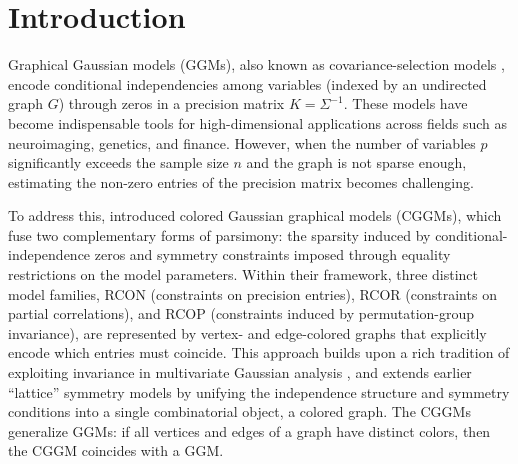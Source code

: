 \documentclass[12pt]{amsart}
\theoremstyle{plain}
\theoremstyle{definition}
\theoremstyle{remark}
\newcommand{\1}{\mathbf{1}}
\begin{document}
\section{Introduction}

Graphical Gaussian models (GGMs), also known as covariance-selection models \citep{D72,L96}, encode conditional independencies among variables (indexed by an undirected graph $G$) through zeros in a precision matrix $K=\Sigma^{-1}$. These models have become indispensable tools for high-dimensional applications across fields such as neuroimaging, genetics, and finance. However, when the number of variables $p$ significantly exceeds the sample size $n$ and the graph is not sparse enough, estimating the non-zero entries of the precision matrix becomes challenging.

To address this, \citet{HL08} introduced colored Gaussian graphical models (CGGMs), which fuse two complementary forms of parsimony: the sparsity induced by conditional-independence zeros and symmetry constraints imposed through equality restrictions on the model parameters. Within their framework, three distinct model families, RCON (constraints on precision entries), RCOR (constraints on partial correlations), and RCOP (constraints induced by permutation-group invariance), are represented by vertex- and edge-colored graphs that explicitly encode which entries must coincide. This approach builds upon a rich tradition of exploiting invariance in multivariate Gaussian analysis \citep{Wilks,OP69}, and extends earlier ``lattice'' symmetry models \citep{AM98,Ma00} by unifying the independence structure and symmetry conditions into a single combinatorial object, a colored graph. The CGGMs generalize GGMs: if all vertices and edges of a graph have distinct colors, then the CGGM coincides with a GGM.
\end{document}
